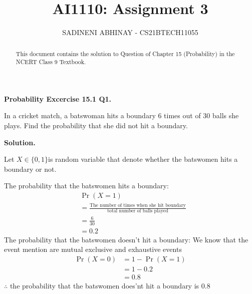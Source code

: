 \documentclass[journal,12pt,twocolumn]{IEEEtran}
\title{
	AI1110: Assignment 3
}
\author{ 
	SADINENI ABHINAY - CS21BTECH11055
}
\providecommand{\pr}[1]{\ensuremath{\Pr\left(#1\right)}}
\begin{document}
	\maketitle
	\begin{abstract}
		This document contains the solution to Question of Chapter 15 (Probability) in the NCERT Class 9 Textbook.
	\end{abstract}
	
	\textbf{Probability Excercise 15.1 Q1.}
	
	In a cricket match, a batswoman hits a boundary 6 times out of 30 balls she plays. Find the probability that she did not hit a boundary.
	
	\textbf{Solution.}
	
	Let $X \in \{0,1\} $is random variable that denote whether the batswomen hits a boundary or not.
	
	\begin{table}[ht!]
		\centering
		
	\end{table}
The probability that the batswomen hits a  boundary:
\begin{align}
	 &\pr{X=1}\\
&=\frac{\text{The number of times when she hit boundary}}{\text{total number of balls played}}\\
	&=\frac{6}{30}\\
	&=0.2
\end{align}
The probability that the batswomen doesn't hit a boundary:
We know that the event mention are mutual exclusive and exhaustive events 
\begin{align}
	\pr{X=0}&=1-\pr{X=1}\\
	&=1-0.2\\
	&=0.8
\end{align}
	$\therefore$ the probability that the batswomen does'nt hit
	 a boundary is 0.8
\end{document}
